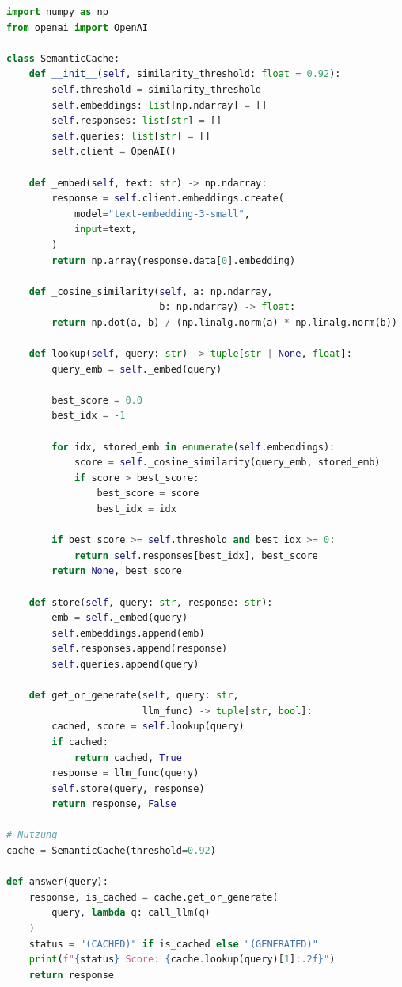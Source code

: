 \begin{lstlisting}[language=Python, caption=Semantic Cache mit Embedding-Vergleich]
import numpy as np
from openai import OpenAI

class SemanticCache:
    def __init__(self, similarity_threshold: float = 0.92):
        self.threshold = similarity_threshold
        self.embeddings: list[np.ndarray] = []
        self.responses: list[str] = []
        self.queries: list[str] = []
        self.client = OpenAI()

    def _embed(self, text: str) -> np.ndarray:
        response = self.client.embeddings.create(
            model="text-embedding-3-small",
            input=text,
        )
        return np.array(response.data[0].embedding)

    def _cosine_similarity(self, a: np.ndarray,
                           b: np.ndarray) -> float:
        return np.dot(a, b) / (np.linalg.norm(a) * np.linalg.norm(b))

    def lookup(self, query: str) -> tuple[str | None, float]:
        query_emb = self._embed(query)

        best_score = 0.0
        best_idx = -1

        for idx, stored_emb in enumerate(self.embeddings):
            score = self._cosine_similarity(query_emb, stored_emb)
            if score > best_score:
                best_score = score
                best_idx = idx

        if best_score >= self.threshold and best_idx >= 0:
            return self.responses[best_idx], best_score
        return None, best_score

    def store(self, query: str, response: str):
        emb = self._embed(query)
        self.embeddings.append(emb)
        self.responses.append(response)
        self.queries.append(query)

    def get_or_generate(self, query: str,
                        llm_func) -> tuple[str, bool]:
        cached, score = self.lookup(query)
        if cached:
            return cached, True
        response = llm_func(query)
        self.store(query, response)
        return response, False

# Nutzung
cache = SemanticCache(threshold=0.92)

def answer(query):
    response, is_cached = cache.get_or_generate(
        query, lambda q: call_llm(q)
    )
    status = "(CACHED)" if is_cached else "(GENERATED)"
    print(f"{status} Score: {cache.lookup(query)[1]:.2f}")
    return response
\end{lstlisting}

